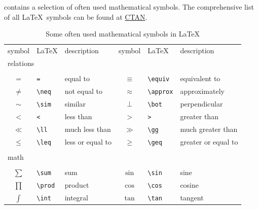 \label{ch:mathsymbols}

 contains a selection of often used mathematical symbols. The comprehensive list of all \LaTeX\ symbols can be found at \href{http://mirrors.ctan.org/info/symbols/comprehensive/symbols-a4.pdf}{CTAN}.

\begin{table}[ht!]\centering
\caption{Some often used mathematical symbols in \LaTeX}\label{tab:mathsymbols}
    \begin{tabular}{cll|cll}
        \toprule
        symbol	        &	 \LaTeX  	        &	 description 	    &	symbol	            &	 \LaTeX  	&	 description\\[+2ex]	
        \multicolumn{2}{l}{relations}			&		                &		                &		                    &		                \\\\
        $=$	            &	\verb|=|	        &	equal to	        &	$\equiv$	        &	\verb|\equiv|	        &	equivalent to	    \\
        $\neq$	        &	\verb|\neq|	        &	not equal to    	&	$\approx$	        &	\verb|\approx|	        &	approximately	    \\
        $\sim$	        &	\verb|\sim|	        &	similar         	&	$\bot$	            &	\verb|\bot|	            &	perpendicular	\\
        $<$	            &	\verb|<|	        &	less than	        &	$>$	                &	\verb|>|	            &	greater than	    \\
        $\ll$	        &	\verb|\ll|	        &	much less than	    &	$\gg$	            &	\verb|\gg|	            &	much greater than	\\
        $\leq$	        &	\verb|\leq|	        &	less or equal to	&	$\geq$	            &	\verb|\geq|	            &	greater or equal to	\\
        \\\multicolumn{2}{l}{math}			    &		                &		                &		                    &		                \\\\
        $\sum$	        &	\verb|\sum|	        &	sum	                &	$\sin$	            &	\verb|\sin|	            &	sine	            \\
        $\prod$	        &	\verb|\prod|	    &	product	            &	$\cos$	            &	\verb|\cos|	            &	cosine	            \\
        $\int$	        &	\verb|\int|	        &	integral	        &	$\tan$	            &	\verb|\tan|	            &	tangent	            \\

\end{tabular}
\end{table}
